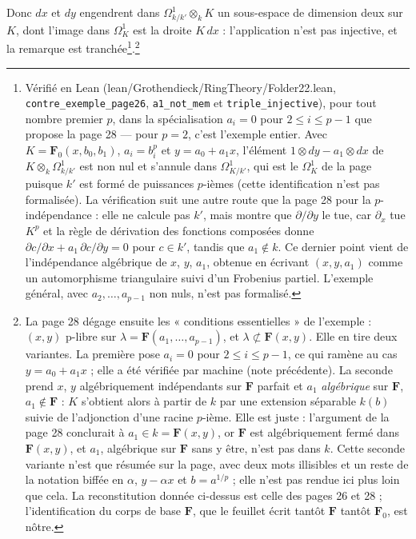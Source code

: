 \documentclass[11pt,a4paper]{article}
\begin{document}
Donc $dx$ et $dy$ engendrent dans $\Omega^1_{k/k'} \otimes_k K$ un sous-espace
de dimension deux sur $K$, dont l'image dans $\Omega^1_K$ est la droite
$K\,dx$ : l'application n'est pas injective, et la remarque est
tranchée\footnote{Vérifié en Lean (lean/Grothendieck/RingTheory/Folder22.lean,
\texttt{contre\_exemple\_page26}, \texttt{a1\_not\_mem} et
\texttt{triple\_injective}), pour tout nombre premier $p$, dans la
spécialisation $a_i = 0$ pour $2 \leqslant i \leqslant p-1$ que propose la
page 28 — pour $p = 2$, c'est l'exemple entier. Avec $K = \mathbf{F}_0(x, b_0,
b_1)$, $a_i = b_i^p$ et $y = a_0 + a_1 x$, l'élément $1 \otimes dy - a_1 \otimes
dx$ de $K \otimes_k \Omega^1_{k/k'}$ est non nul et s'annule dans
$\Omega^1_{K/k'}$, qui est le $\Omega^1_K$ de la page puisque $k'$ est formé de
puissances $p$-ièmes (cette identification n'est pas formalisée). La
vérification suit une autre route que la page 28 pour la $p$-indépendance :
elle ne calcule pas $k'$, mais montre que $\partial/\partial y$ le tue, car
$\partial_x$ tue $K^p$ et la règle de dérivation des fonctions composées donne
$\partial c/\partial x + a_1\,\partial c/\partial y = 0$ pour $c \in k'$,
tandis que $a_1 \notin k$. Ce dernier point vient de l'indépendance algébrique
de $x$, $y$, $a_1$, obtenue en écrivant $(x, y, a_1)$ comme un automorphisme
triangulaire suivi d'un Frobenius partiel. L'exemple général, avec
$a_2, \ldots, a_{p-1}$ non nuls, n'est pas formalisé.}.\footnote{La page 28
dégage ensuite les « conditions essentielles » de l'exemple : $(x,y)$
p-libre sur $\lambda = \mathbf{F}(a_1, \ldots, a_{p-1})$, et
$\lambda \not\subset \mathbf{F}(x,y)$. Elle en tire deux variantes. La
première pose $a_i = 0$ pour $2 \leqslant i \leqslant p-1$, ce qui ramène au
cas $y = a_0 + a_1 x$ ; elle a été vérifiée par machine (note précédente). La
seconde prend $x$, $y$ algébriquement indépendants sur $\mathbf{F}$ parfait et
$a_1$ \emph{algébrique} sur $\mathbf{F}$, $a_1 \notin \mathbf{F}$ : $K$
s'obtient alors à partir de $k$ par une extension séparable $k(b)$ suivie de
l'adjonction d'une racine $p$-ième. Elle est juste : l'argument de la page 28
conclurait à $a_1 \in k = \mathbf{F}(x,y)$, or $\mathbf{F}$ est
algébriquement fermé dans $\mathbf{F}(x,y)$, et $a_1$, algébrique sur
$\mathbf{F}$ sans y être, n'est pas dans $k$. Cette seconde variante n'est que
résumée sur la page, avec deux mots illisibles et un reste de la notation
biffée en $\alpha$, $y - \alpha x$ et $b = a^{1/p}$ ; elle n'est pas rendue ici
plus loin que cela. La reconstitution donnée ci-dessus est celle des pages 26
et 28 ; l'identification du corps de base $\mathbf{F}$, que le feuillet écrit
tantôt $\mathbf{F}$ tantôt $\mathbf{F}_0$, est nôtre.}
\end{document}
